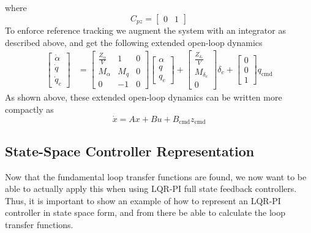 \begin{example}
  where
  \begin{equation*}
    C_{pz}=
    \begin{bmatrix}
      0 & 1
    \end{bmatrix}
  \end{equation*}
  To enforce reference tracking we augment the system with an integrator as described above, and get the following extended open-loop dynamics
  \begin{align*}
    \begin{bmatrix}
      \dot{\alpha} \\
      \dot{q} \\
      \dot{q}_{e}
    \end{bmatrix}&=
    \begin{bmatrix}
      \frac{Z_{\alpha}}{V} & 1 & 0 \\
      M_{\alpha} & M_{q} & 0 \\
      0 & -1 & 0
    \end{bmatrix}
    \begin{bmatrix}
      \alpha \\
      q \\
      q_{e}
    \end{bmatrix}+
    \begin{bmatrix}
      \frac{Z_{\delta_{e}}}{V} \\
      M_{\delta_{e}} \\
      0
    \end{bmatrix}\delta_{e}+
    \begin{bmatrix}
      0 \\
      0 \\
      1
    \end{bmatrix}q_{\text{cmd}}
  \end{align*}
  As shown above, these extended open-loop dynamics can be written more compactly as
  \begin{equation*}
    \dot{x}=Ax+Bu+B_{\text{cmd}}z_{\text{cmd}}
  \end{equation*}
\end{example}



\subsection{State-Space Controller Representation}
Now that the fundamental loop transfer functions are found, we now want to be able to actually apply this when using LQR-PI full state feedback controllers.
Thus, it is important to show an example of how to represent an LQR-PI controller in state space form, and from there be able to calculate the loop transfer functions.

